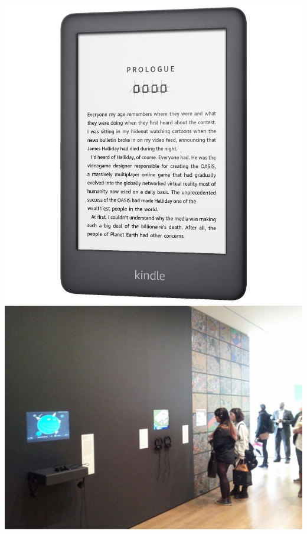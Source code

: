 \documentclass{beamer}
\begin{document}
\begin{frame}
    \includegraphics[scale=0.1]{kindle}
    \includegraphics[scale=0.1]{moma}
   
\end{frame}
\end{document}
